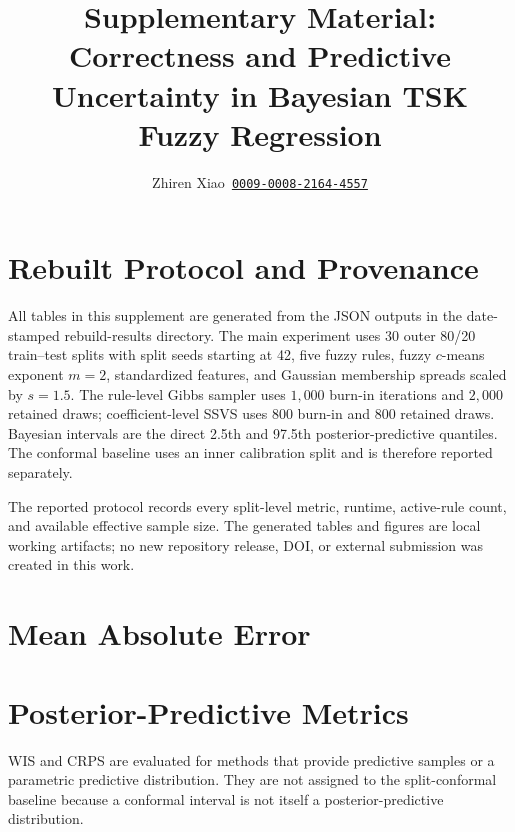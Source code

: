 \documentclass[1p,times]{elsarticle}
\providecommand{\orcid}[1]{\href{https://orcid.org/#1}{\texttt{#1}}}
\begin{document}
\begin{frontmatter}
\title{Supplementary Material: Correctness and Predictive Uncertainty in Bayesian TSK Fuzzy Regression}
\author[addr]{Zhiren Xiao~\orcid{0009-0008-2164-4557}}
\address[addr]{Guangdong University of Finance, Guangzhou, China}
\end{frontmatter}

\section{Rebuilt Protocol and Provenance}

All tables in this supplement are generated from the JSON outputs in the
date-stamped rebuild-results directory.  The main experiment uses 30
outer 80/20 train--test splits with split seeds starting at 42, five fuzzy
rules, fuzzy $c$-means exponent $m=2$, standardized features, and Gaussian
membership spreads scaled by $s=1.5$.  The rule-level Gibbs sampler uses
$1{,}000$ burn-in iterations and $2{,}000$ retained draws; coefficient-level
SSVS uses $800$ burn-in and $800$ retained draws.  Bayesian intervals are
the direct 2.5th and 97.5th posterior-predictive quantiles.  The conformal
baseline uses an inner calibration split and is therefore reported
separately.

The reported protocol records every split-level metric, runtime, active-rule
count, and available effective sample size.  The generated tables and
figures are local working artifacts; no new repository release, DOI, or
external submission was created in this work.

\section{Mean Absolute Error}



\FloatBarrier

\section{Posterior-Predictive Metrics}





WIS and CRPS are evaluated for methods that provide predictive samples or a
parametric predictive distribution.  They are not assigned to the
split-conformal baseline because a conformal interval is not itself a
posterior-predictive distribution.
\end{document}
